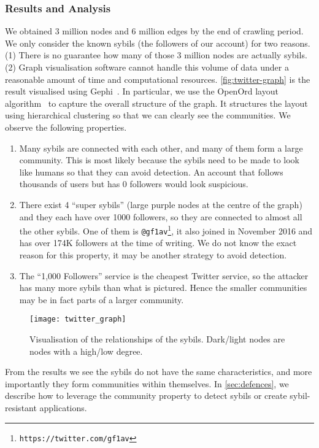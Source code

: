 \subsubsection{Results and Analysis}
We obtained 3 million nodes and 6 million edges by the end of crawling period.
We only consider the known sybils (the followers of our account) for two reasons.
(1) There is no guarantee how many of those 3 million nodes are actually sybils.
(2) Graph visualisation software cannot handle this volume of data under a
reasonable amount of time and computational resources.
\autoref{fig:twitter-graph} is the result visualised using
Gephi~\cite{bastian2009gephi}. In particular, we use the OpenOrd layout
algorithm~\cite{martin2011openord} to capture the overall structure of the
graph. It structures the layout using hierarchical clustering so that we can
clearly see the communities. We observe the following properties.
\begin{enumerate}
  \item Many sybils are connected with each other, and many of them form a large
    community. This is most likely because the sybils need to be made to look like
    humans so that they can avoid detection. An account that follows thousands of
    users but has 0 followers would look suspicious.
  \item There exist 4 ``super sybils'' (large purple nodes at the centre of the
    graph) and they each have over 1000 followers, so they are connected to
    almost all the other sybils. One of them is
    \verb!@gf1av!\footnote{\texttt{https://twitter.com/gf1av}}, it also joined
    in November 2016 and has over 174K followers at the time of writing. We do
    not know the exact reason for this property, it may be another strategy to
    avoid detection.
  \item The ``1,000 Followers'' service is the cheapest Twitter service, so the
    attacker has many more sybils than what is pictured. Hence the smaller
    communities may be in fact parts of a larger community.
\end{enumerate}

\begin{figure}
  \centering
  \texttt{[image: twitter\_graph]}
  \caption{Visualisation of the relationships of the sybils. Dark/light nodes
    are nodes with a high/low degree.}
  \label{fig:twitter-graph}
\end{figure}

From the results we see the sybils do not have the same characteristics, and
more importantly they form communities within themselves. In
\autoref{sec:defences}, we describe how to leverage the community property to
detect sybils or create sybil-resistant applications.

